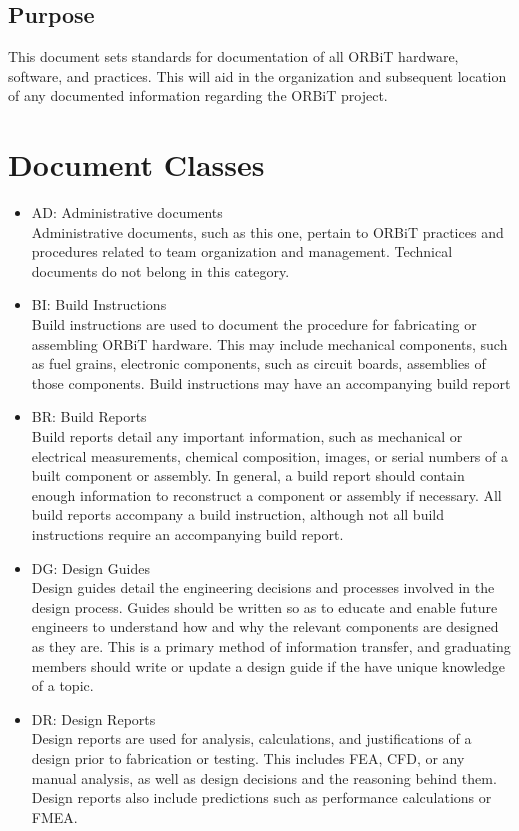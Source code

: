 \documentclass[12pt,article]{memoir}
\begin{document}
\section{Purpose}
This document sets standards for documentation of all ORBiT hardware, software, and practices. This will aid in the organization and subsequent location of any documented information regarding the ORBiT project.

\newpage

\chapter{Document Classes}

\begin{itemize}
\item AD: Administrative documents\\
Administrative documents, such as this one, pertain to ORBiT practices and procedures related to team organization and management. Technical documents do not belong in this category.
\item BI: Build Instructions\\
Build instructions are used to document the procedure for fabricating or assembling ORBiT hardware. This may include mechanical components, such as fuel grains, electronic components, such as circuit boards, assemblies of those components. Build instructions may have an accompanying build report
\item BR: Build Reports\\
Build reports detail any important information, such as mechanical or electrical measurements, chemical composition, images, or serial numbers of a built component or assembly. In general, a build report should contain enough information to reconstruct a component or assembly if necessary. All build reports accompany a build instruction, although not all build instructions require an accompanying build report.
\item DG: Design Guides\\
Design guides detail the engineering decisions and processes involved in the design process. Guides should be written so as to educate and enable future engineers to understand how and why the relevant components are designed as they are. This is a primary method of information transfer, and graduating members should write or update a design guide if the have unique knowledge of a topic.
\item DR: Design Reports\\
Design reports are used for analysis, calculations, and justifications of a design prior to fabrication or testing. This includes FEA, CFD, or any manual analysis, as well as design decisions and the reasoning behind them. Design reports also include predictions such as performance calculations or FMEA.

\end{itemize}
\end{document}
